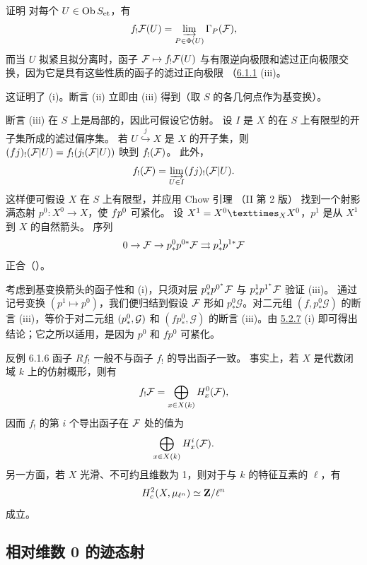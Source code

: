 \begin{enonce*}[remark]{证明}
对\pageoriginale 每个 $U\in \Ob S_{\et}$，有
\[
f_{!}\Ff (U)=\varinjlim_{P\in
\Phi(U)}\Gamma_{\sisi{p}{P}}(\Ff ){\quoi},
\]
而当 $U$ 拟紧且拟分离时，函子 $\Ff \mapsto f_{!}\Ff (U)$
与有限逆向极限和滤过正向极限交换，因为它是具有这些性质的函子的滤过正向极限
（\hyperref[XVII.prop6.1.1]{6.1.1}\sisi{)}{} (iii)\sisi{}{)}。

这证明了 (i)。断言 (ii) 立即由 (iii) 得到（取 $S$ 的各几何点作为基变换）。

断言 (iii) 在 $S$ 上是局部的，因此可假设它仿射。
设 $I$ 是 $X$ 的在 $S$ 上有限型的开子集所成的滤过偏序集。
若 $U\overset{j}{\hookrightarrow}X$ 是 $X$ 的开子集，则
$(fj)_{!}(\Ff |U)=f_{!}(j_{!}(\Ff |U))$ 映到 $f_{!}(\Ff\sisi{|U}{})$。
此外，
$$
f_{!}(\Ff )=\varinjlim_{U\in I}
(fj\sisi{}{)}_{!}(\Ff |U){\quoi}.
$$
这样便可假设 $X$ 在 $S$ 上有限型，并应用 Chow 引理
（\EGA II 第 2\sisi{}{} 版）
找到一个射影满态射 $p^{0}:X^{0}\rightarrow X$，使 $fp\sisi{_{0}}{^0}$ 可紧化。
设 $X^{1}=\fprod{X^{0}}{X^{0}}{X}$，$p^{1}$ 是从 $X^{1}$ 到 $X$ 的自然箭头。
序列
$$
0\rightarrow \Ff \rightarrow
p^{0}_{\ast}p^{0{\ast}}\Ff \rightrightarrows
p^{1}_{\ast}p^{1{\ast}}\Ff
$$
正合（）。

考虑到基变换箭头的函子性和 (i)，只须对层
$p^{0}_{\ast}p^{0^{\ast}}\Ff $ 与 $p^{1}_{\ast}p^{1^{\ast}}\Ff $ 验证 (iii)。
通过记号变换 $(p^{1}\mapsto p^{0})$，我们\pageoriginale 便归结到假设
$\Ff $ 形如 $p^{0}_{\ast}\mathcal{G}$。对二元组 $(f,p^{0}_{\ast}\mathcal{G})$
的断言 (iii)，等价于对二元组 $(p^{0}_{\ast}\sisi{}{,}\mathcal{G})$ 和
$(fp^{0}_{\ast},\mathcal{G})$ 的断言 (iii)。由 \hyperref[XVII.var5.2.7]{5.2.7} (i)
即可得出结论；它之所以适用，是因为 $p^{0}$ 和 $fp^{0}$ 可紧化。
\end{enonce*}

\begin{enonce*}[remark]{反例 6.1.6}
函子 $Rf_{!}$ 一般不与函子 $f_{!}$ 的导出函子一致。
事实上，若 $X$ 是代数闭域 $k$ 上的仿射概形，则有
$$
f_{!}\Ff =\sisi{\sum}{\bigoplus}_{x\in X(k)}H^{0}_{x}(\Ff ){\quoi},
$$
因而 $f_{!}$ 的第 $i$ 个导出函子在 $\Ff $ 处的值为
$$
\sisi{\sum}{\bigoplus}_{x\in X(k)}H^{i}_{x}(\Ff ){\quoi}.
$$
另一方面，若 $X$ 光滑、不可约且维数为 1，则对于与 $k$ 的特征互素的 $\ell$，有
$$
H^{2}_{c}(X,\mu_{\ell^{n}})\simeq \ZZ/\ell^{n}
$$
成立。
\end{enonce*}

\subsection{相对维数 0 的迹态射}

